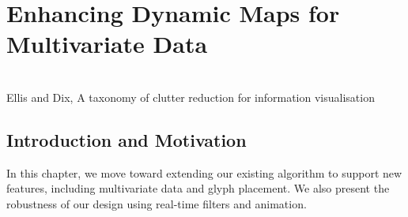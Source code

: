 \chapter{Enhancing Dynamic Maps for Multivariate Data}
\label{chap:MultivariateMaps}
 \cite{mcnabb2019multivariateT} \\
{Ellis and Dix, A taxonomy of clutter reduction for information visualisation \cite{ellis2007taxonomy}}



\newpage
{\footnotesize \hypersetup{linkcolor=black}
\minitoc}

\clearpage
\section{Introduction and Motivation} \label{sec:introMM}
In this chapter, we move toward extending our existing algorithm to support new features, including multivariate data and glyph placement. We also present the robustness of our design using real-time filters and animation.

